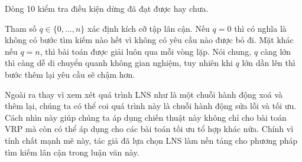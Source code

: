 Dòng 10 kiểm tra điều kiện dừng đã đạt được hay chưa.

Tham số $q \in \{0,...,n\}$ xác định kích cỡ tập lân cận. Nếu $q = 0$ thì có nghĩa là không có bước tìm kiếm nào hết vì không có yêu cầu nào được bỏ đi. Mặt khác nếu $q = n$, thì bài toán được giải luôn qua mỗi vòng lặp. Nói chung, $q$ càng lớn thì càng dễ di chuyển quanh không gian nghiệm, tuy nhiên khi $q$ lớn dần lên thì bước thêm lại yêu cầu sẽ chậm hơn. 

Ngoài ra thay vì xem xét quá trình LNS như là một chuỗi hành động xoá và thêm lại, chúng ta có thể coi quá trình này là chuỗi hành động sửa lỗi và tối ưu. Cách nhìn này giúp chúng ta áp dụng chiến thuật này không chỉ cho bài toán VRP mà còn có thể áp dụng cho các bài toán tối ưu tổ hợp khác nữa. Chính vì tính chất mạnh mẽ này, tác giả đã lựa chọn LNS làm nền tảng cho phương pháp tìm kiếm lân cận trong luận văn này.



